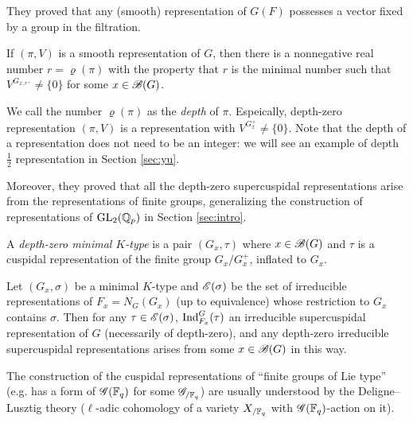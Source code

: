 They proved that any (smooth) representation of $G(F)$ possesses a vector fixed by a group in the filtration.

\begin{theorem}
\label{thm:mpdepth}
If $(\pi, V)$ is a smooth representation of $G$, then there is a nonnegative real number $r = \varrho(\pi)$ with the property that $r$ is the minimal number such that $V^{G_{x, r^+}} \ne \{0\}$ for some $x \in \mathscr{B}(G)$.
\end{theorem}

We call the number $\varrho(\pi)$ as the \emph{depth} of $\pi$.
Espeically, depth-zero representation $(\pi, V)$ is a representation with $V^{G_x^+} \ne \{0\}$.
Note that the depth of a representation does not need to be an integer: we will see an example of depth $\frac{1}{2}$ representation in Section \ref{sec:yu}.

Moreover, they proved that all the depth-zero supercuspidal representations arise from the representations of finite groups, generalizing the construction of representations of $\mathrm{GL}_2(\mathbb{Q}_p)$ in Section \ref{sec:intro}.

\begin{definition}
A \emph{depth-zero minimal $K$-type} is a pair $(G_x, \tau)$ where $x \in \mathscr{B}(G)$ and $\tau$ is a cuspidal representation of the finite group $G_{x} / G_{x}^+$, inflated to $G_{x}$.
\end{definition}

\begin{theorem}
\label{thm:mpd0}
Let $(G_x, \sigma)$ be a minimal $K$-type and $\mathscr{E}(\sigma)$ be the set of irreducible representations of $F_{x} = N_G(G_x)$ (up to equivalence) whose restriction to $G_x$ contains $\sigma$.
Then for any $\tau \in \mathscr{E}(\sigma)$, $\mathrm{Ind}_{F_x}^{G}(\tau)$ an irreducible supercuspidal representation of $G$ (necessarily of depth-zero), and any depth-zero irreducible supercuspidal representations arises from some $x \in \mathscr{B}(G)$ in this way.
\end{theorem}
The construction of the cuspidal representations of ``finite groups of Lie type'' (e.g. has a form of $\mathscr{G}(\mathbb{F}_q)$ for some $\mathscr{G}_{/\mathbb{F}_q}$) are usually understood by the Deligne--Lusztig theory ($\ell$-adic cohomology of a variety $X_{/\mathbb{F}_q}$ with $\mathscr{G}(\mathbb{F}_q)$-action on it).